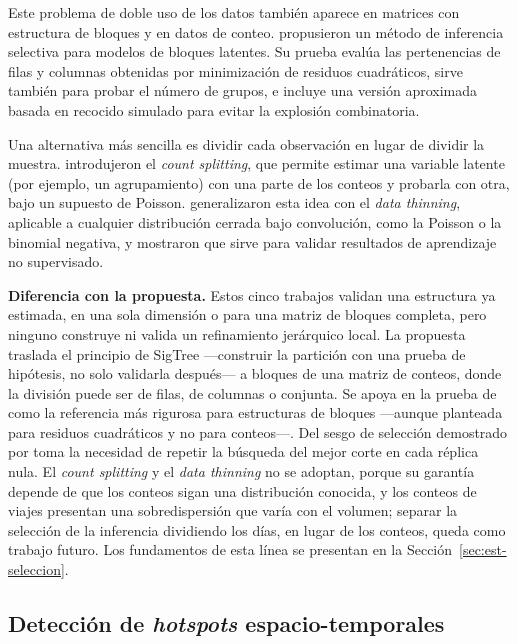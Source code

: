 Este problema de doble uso de los datos también aparece en matrices con
estructura de bloques y en datos de conteo. \cite{Watanabe2021si}
propusieron un método de inferencia selectiva para modelos de bloques
latentes. Su prueba evalúa las pertenencias de filas y columnas obtenidas
por minimización de residuos cuadráticos, sirve también para probar el
número de grupos, e incluye una versión aproximada basada en recocido
simulado para evitar la explosión combinatoria.

Una alternativa más sencilla es dividir cada observación en lugar de
dividir la muestra. \cite{Neufeld2024cs} introdujeron el \emph{count
splitting}, que permite estimar una variable latente (por ejemplo, un
agrupamiento) con una parte de los conteos y probarla con otra, bajo un
supuesto de Poisson. \cite{Neufeld2024dt} generalizaron esta idea con el
\emph{data thinning}, aplicable a cualquier distribución cerrada bajo
convolución, como la Poisson o la binomial negativa, y mostraron que sirve
para validar resultados de aprendizaje no supervisado.

\textbf{Diferencia con la propuesta.} Estos cinco trabajos validan una
estructura ya estimada, en una sola dimensión o para una matriz de bloques
completa, pero ninguno construye ni valida un refinamiento jerárquico
local. La propuesta traslada el principio de SigTree —construir la
partición con una prueba de hipótesis, no solo validarla después— a
bloques de una matriz de conteos, donde la división puede ser de filas, de
columnas o conjunta. Se apoya en la prueba de \cite{Watanabe2021si} como la
referencia más rigurosa para estructuras de bloques —aunque planteada para
residuos cuadráticos y no para conteos—. Del sesgo de selección demostrado por
\cite{Gao2024} toma la necesidad de repetir la búsqueda del mejor corte en cada
réplica nula. El \emph{count splitting} y el \emph{data thinning} no se adoptan,
porque su garantía depende de que los conteos sigan una distribución conocida,
y los conteos de viajes presentan una sobredispersión que varía con el volumen;
separar la selección de la inferencia dividiendo los días, en lugar de los
conteos, queda como trabajo futuro. Los fundamentos de esta línea se presentan
en la Sección~\ref{sec:est-seleccion}.

\subsection{Detección de \emph{hotspots} espacio-temporales}
\label{sec:ea_hotspots}

